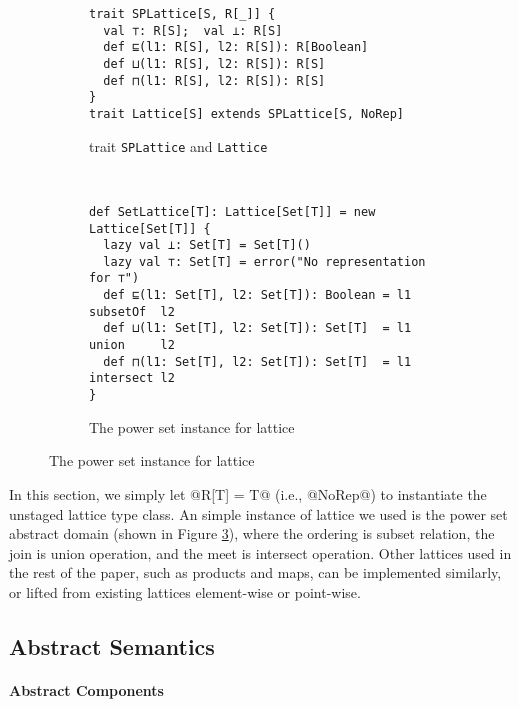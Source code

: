 \begin{figure}[h!]
  \centering
  \begin{subfigure}[b]{0.45\textwidth}
  \begin{lstlisting}[style=small]
trait SPLattice[S, R[_]] {
  val ⊤: R[S];  val ⊥: R[S]
  def ⊑(l1: R[S], l2: R[S]): R[Boolean]
  def ⊔(l1: R[S], l2: R[S]): R[S]
  def ⊓(l1: R[S], l2: R[S]): R[S]
}
trait Lattice[S] extends SPLattice[S, NoRep]
  \end{lstlisting}
  \caption{trait \texttt{SPLattice} and \texttt{Lattice}} \label{fig:splattice}
  \end{subfigure}
  ~
  \begin{subfigure}[b]{0.6\textwidth}
\begin{lstlisting}[style=small]
def SetLattice[T]: Lattice[Set[T]] = new Lattice[Set[T]] {
  lazy val ⊥: Set[T] = Set[T]()
  lazy val ⊤: Set[T] = error("No representation for ⊤")
  def ⊑(l1: Set[T], l2: Set[T]): Boolean = l1 subsetOf  l2
  def ⊔(l1: Set[T], l2: Set[T]): Set[T]  = l1 union     l2
  def ⊓(l1: Set[T], l2: Set[T]): Set[T]  = l1 intersect l2
}
\end{lstlisting}
  \caption{The power set instance for lattice} \label{fig:powerset}
\end{subfigure}
\end{figure}

In this section, we simply let @R[T] = T@ (i.e., @NoRep@) to instantiate the
unstaged lattice type class. An simple instance of lattice we used is the power
set abstract domain (shown in Figure \ref{fig:powerset}), where the ordering is subset relation, the join is union
operation, and the meet is intersect operation.
Other lattices used in the rest of the paper, such as products and maps, can be
implemented similarly, or lifted from existing lattices element-wise or
point-wise.

\subsection{Abstract Semantics}

\paragraph{Abstract Components}


